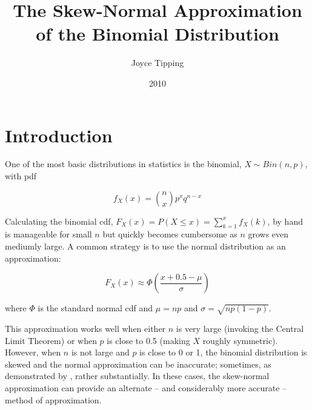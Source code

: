 \documentclass{article}
\begin{document}
\title{The Skew-Normal Approximation of the Binomial Distribution}
\author{Joyce Tipping}
\date{2010}
\maketitle

\section{Introduction}

One of the most basic distributions in statistics is the binomial, $X \sim
Bin(n,p)$, with pdf

\begin{equation*}
  f_X(x) = \binom{n}{x} p^x q^{n-x}
\end{equation*}

Calculating the binomial cdf, $F_X(x) = P(X \leq x) = \sum_{k=1}^x f_X(k)$, by
hand is manageable for small $n$ but quickly becomes cumbersome as $n$ grows
even mediumly large. A common strategy is to use the normal distribution as an
approximation:

\begin{equation}
  F_X(x) \approx \Phi \left( \frac{x + 0.5 - \mu}{\sigma} \right)
\end{equation}

where $\Phi$ is the standard normal cdf and $\mu = np$ and $\sigma =
\sqrt{np(1-p)}$.

This approximation works well when either $n$ is very large (invoking the
Central Limit Theorem) or when $p$ is close to 0.5 (making $X$ roughly
symmetric). However, when $n$ is not large and $p$ is close to 0 or 1, the
binomial distribution is skewed and the normal approximation can be inaccurate;
sometimes, as demonstrated by \citet{mabs}, rather substantially. In these
cases, the skew-normal approximation can provide an alternate -- and
considerably more accurate -- method of approximation.

%
%

\end{document}
